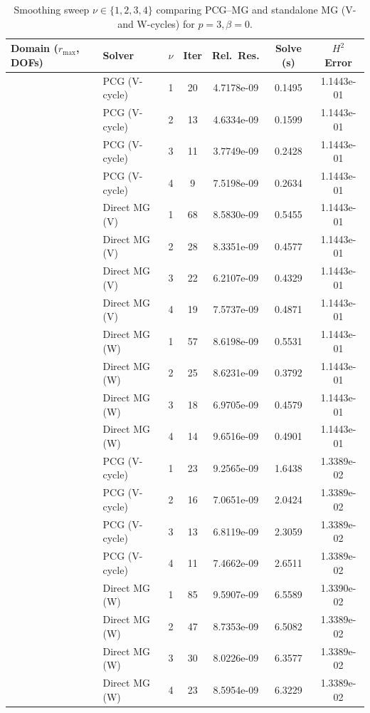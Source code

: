\documentclass[11pt,a4paper]{article}
\begin{document}
\begin{table}[htbp]
\centering
\caption{Smoothing sweep $\nu \in \{1,2,3,4\}$ comparing PCG--MG and standalone MG (V- and W-cycles) for $p=3, \beta=0$.}
\label{tab:nu_sweep}
\small
\begin{tabular}{llccccc}
\toprule
Domain ($r_{\max}$, DOFs) & Solver & $\nu$ & Iter & Rel.\ Res. & Solve (s) & $H^2$ Error \\
\midrule
{}
 & PCG (V-cycle) & 1 & 20 & 4.7178e-09 & 0.1495 & 1.1443e-01 \\
 & PCG (V-cycle) & 2 & 13 & 4.6334e-09 & 0.1599 & 1.1443e-01 \\
 & PCG (V-cycle) & 3 & 11 & 3.7749e-09 & 0.2428 & 1.1443e-01 \\
 & PCG (V-cycle) & 4 & 9  & 7.5198e-09 & 0.2634 & 1.1443e-01 \\
\cmidrule(lr){2-7}
 & Direct MG (V) & 1 & 68 & 8.5830e-09 & 0.5455 & 1.1443e-01 \\
 & Direct MG (V) & 2 & 28 & 8.3351e-09 & 0.4577 & 1.1443e-01 \\
 & Direct MG (V) & 3 & 22 & 6.2107e-09 & 0.4329 & 1.1443e-01 \\
 & Direct MG (V) & 4 & 19 & 7.5737e-09 & 0.4871 & 1.1443e-01 \\
\cmidrule(lr){2-7}
 & Direct MG (W) & 1 & 57 & 8.6198e-09 & 0.5531 & 1.1443e-01 \\
 & Direct MG (W) & 2 & 25 & 8.6231e-09 & 0.3792 & 1.1443e-01 \\
 & Direct MG (W) & 3 & 18 & 6.9705e-09 & 0.4579 & 1.1443e-01 \\
 & Direct MG (W) & 4 & 14 & 9.6516e-09 & 0.4901 & 1.1443e-01 \\
\midrule
{}
 & PCG (V-cycle) & 1 & 23 & 9.2565e-09 & 1.6438 & 1.3389e-02 \\
 & PCG (V-cycle) & 2 & 16 & 7.0651e-09 & 2.0424 & 1.3389e-02 \\
 & PCG (V-cycle) & 3 & 13 & 6.8119e-09 & 2.3059 & 1.3389e-02 \\
 & PCG (V-cycle) & 4 & 11 & 7.4662e-09 & 2.6511 & 1.3389e-02 \\
\cmidrule(lr){2-7}
 & Direct MG (W) & 1 & 85 & 9.5907e-09 & 6.5589 & 1.3390e-02 \\
 & Direct MG (W) & 2 & 47 & 8.7353e-09 & 6.5082 & 1.3389e-02 \\
 & Direct MG (W) & 3 & 30 & 8.0226e-09 & 6.3577 & 1.3389e-02 \\
 & Direct MG (W) & 4 & 23 & 8.5954e-09 & 6.3229 & 1.3389e-02 \\
\bottomrule
\end{tabular}
\end{table}
\end{document}
